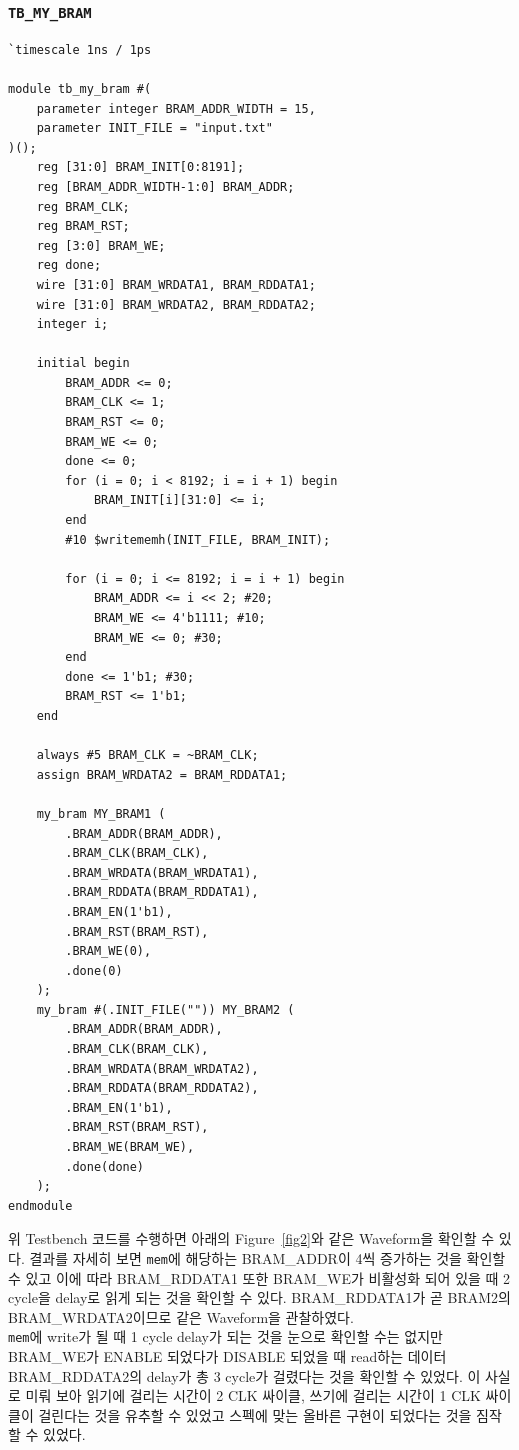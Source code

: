 \documentclass{article}
\begin{document}
\newpage
\subsubsection*{\texttt{TB\_MY\_BRAM}}
\begin{lstlisting}[style={verilog-style}]
`timescale 1ns / 1ps

module tb_my_bram #(
    parameter integer BRAM_ADDR_WIDTH = 15,
    parameter INIT_FILE = "input.txt"
)();
    reg [31:0] BRAM_INIT[0:8191];
    reg [BRAM_ADDR_WIDTH-1:0] BRAM_ADDR;
    reg BRAM_CLK;
    reg BRAM_RST;
    reg [3:0] BRAM_WE;
    reg done;
    wire [31:0] BRAM_WRDATA1, BRAM_RDDATA1;
    wire [31:0] BRAM_WRDATA2, BRAM_RDDATA2;
    integer i;
    
    initial begin
        BRAM_ADDR <= 0;
        BRAM_CLK <= 1;
        BRAM_RST <= 0;
        BRAM_WE <= 0;
        done <= 0;
        for (i = 0; i < 8192; i = i + 1) begin
            BRAM_INIT[i][31:0] <= i;
        end
        #10 $writememh(INIT_FILE, BRAM_INIT);
        
        for (i = 0; i <= 8192; i = i + 1) begin
            BRAM_ADDR <= i << 2; #20;
            BRAM_WE <= 4'b1111; #10;
            BRAM_WE <= 0; #30;
        end
        done <= 1'b1; #30;
        BRAM_RST <= 1'b1;
    end
    
    always #5 BRAM_CLK = ~BRAM_CLK;
    assign BRAM_WRDATA2 = BRAM_RDDATA1;
    
    my_bram MY_BRAM1 (
        .BRAM_ADDR(BRAM_ADDR),
        .BRAM_CLK(BRAM_CLK),
        .BRAM_WRDATA(BRAM_WRDATA1),
        .BRAM_RDDATA(BRAM_RDDATA1),
        .BRAM_EN(1'b1),
        .BRAM_RST(BRAM_RST),
        .BRAM_WE(0),
        .done(0)
    );
    my_bram #(.INIT_FILE("")) MY_BRAM2 (
        .BRAM_ADDR(BRAM_ADDR),
        .BRAM_CLK(BRAM_CLK),
        .BRAM_WRDATA(BRAM_WRDATA2),
        .BRAM_RDDATA(BRAM_RDDATA2),
        .BRAM_EN(1'b1),
        .BRAM_RST(BRAM_RST),
        .BRAM_WE(BRAM_WE),
        .done(done)
    );
endmodule
\end{lstlisting}

위 Testbench 코드를 수행하면 아래의 Figure~\ref{fig2}와 같은 Waveform을 확인할 수 있다. 결과를 자세히 보면 \texttt{mem}에 해당하는 BRAM\_ADDR이 4씩 증가하는 것을 확인할 수 있고 이에 따라 BRAM\_RDDATA1 또한 BRAM\_WE가 비활성화 되어 있을 때 2 cycle을 delay로 읽게 되는 것을 확인할 수 있다. BRAM\_RDDATA1가 곧 BRAM2의 BRAM\_WRDATA2이므로 같은 Waveform을 관찰하였다. \\

\texttt{mem}에 write가 될 때 1 cycle delay가 되는 것을 눈으로 확인할 수는 없지만 BRAM\_WE가 ENABLE 되었다가 DISABLE 되었을 때 read하는 데이터 BRAM\_RDDATA2의 delay가 총 3 cycle가 걸렸다는 것을 확인할 수 있었다. 이 사실로 미뤄 보아 읽기에 걸리는 시간이 2 CLK 싸이클, 쓰기에 걸리는 시간이 1 CLK 싸이클이 걸린다는 것을 유추할 수 있었고 스펙에 맞는 올바른 구현이 되었다는 것을 짐작할 수 있었다.\\
\end{document}
